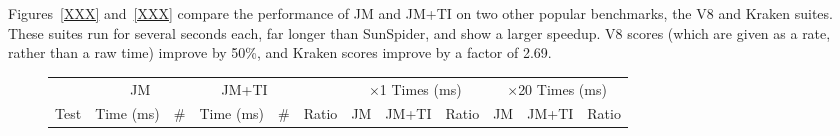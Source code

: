 Figures~\ref{XXX} and~\ref{XXX} compare the performance of JM and JM+TI
on two other popular benchmarks, the V8 \cite{XXX} and Kraken \cite{XXX} suites.
These suites run for several seconds each, far longer than SunSpider,
and show a larger speedup.
V8 scores (which are given as a rate, rather than a raw time) improve by 50\%,
and Kraken scores improve by a factor of 2.69.

\begin{figure*}
\begin{center}
\begin{tabular}{lr@{.}lrr@{.}lrr@{.}lr@{.}lr@{.}lr@{.}lr@{.}lr@{.}lr@{.}l}

\toprule

           & \multicolumn{3}{c}{JM}
           & \multicolumn{3}{c}{JM+TI}
           & \multicolumn{2}{c}{}
           & \multicolumn{6}{c}{$\times$1 Times (ms)}
           & \multicolumn{6}{c}{$\times$20 Times (ms)} \\

\cmidrule(r){2-4}
\cmidrule{5-7}
\cmidrule(r){10-15}
\cmidrule{16-21}

Test       & \multicolumn{2}{c}{Time (ms)} & \#
           & \multicolumn{2}{c}{Time (ms)} & \#
           & \multicolumn{2}{c}{Ratio}
           & \multicolumn{2}{c}{JM}
           & \multicolumn{2}{c}{JM+TI}
           & \multicolumn{2}{c}{Ratio}
           & \multicolumn{2}{c}{JM}
           & \multicolumn{2}{c}{JM+TI}
           & \multicolumn{2}{c}{Ratio} \\

\midrule


\end{tabular}
\end{center}
\end{figure*}
